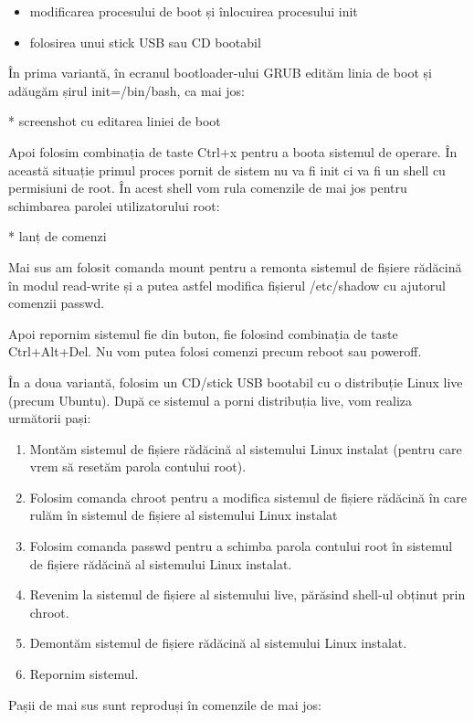 \begin{itemize}
	\item modificarea procesului de boot și înlocuirea procesului init
	\item folosirea unui stick USB sau CD bootabil
\end{itemize}

În prima variantă, în ecranul bootloader-ului GRUB edităm linia de boot și
adăugăm șirul init=/bin/bash, ca mai jos:

* screenshot cu editarea liniei de boot

Apoi folosim combinația de taste Ctrl+x pentru a boota sistemul de operare. În
această situație primul proces pornit de sistem nu va fi init ci va fi un shell
cu permisiuni de root. În acest shell vom rula comenzile de mai jos pentru
schimbarea parolei utilizatorului root:

* lanț de comenzi

Mai sus am folosit comanda mount pentru a remonta sistemul de fișiere rădăcină
în modul read-write și a putea astfel modifica fișierul /etc/shadow cu ajutorul
comenzii passwd.

Apoi repornim sistemul fie din buton, fie folosind combinația de taste
Ctrl+Alt+Del. Nu vom putea folosi comenzi precum reboot sau poweroff.

În a doua variantă, folosim un CD/stick USB bootabil cu o distribuție Linux live
(precum Ubuntu). După ce sistemul a porni distribuția live, vom realiza
următorii pași:

\begin{enumerate}
	\item Montăm sistemul de fișiere rădăcină al sistemului Linux instalat
		(pentru care vrem să resetăm parola contului root).
	\item Folosim comanda chroot pentru a modifica sistemul de fișiere
		rădăcină în care rulăm în sistemul de fișiere al sistemului
		Linux instalat
	\item Folosim comanda passwd pentru a schimba parola contului root în
		sistemul de fișiere rădăcină al sistemului Linux instalat.
	\item Revenim la sistemul de fișiere al sistemului live, părăsind
		shell-ul obținut prin chroot.
	\item Demontăm sistemul de fișiere rădăcină al sistemului Linux
		instalat.
	\item Repornim sistemul.
\end{enumerate}

Pașii de mai sus sunt reproduși în comenzile de mai jos:

